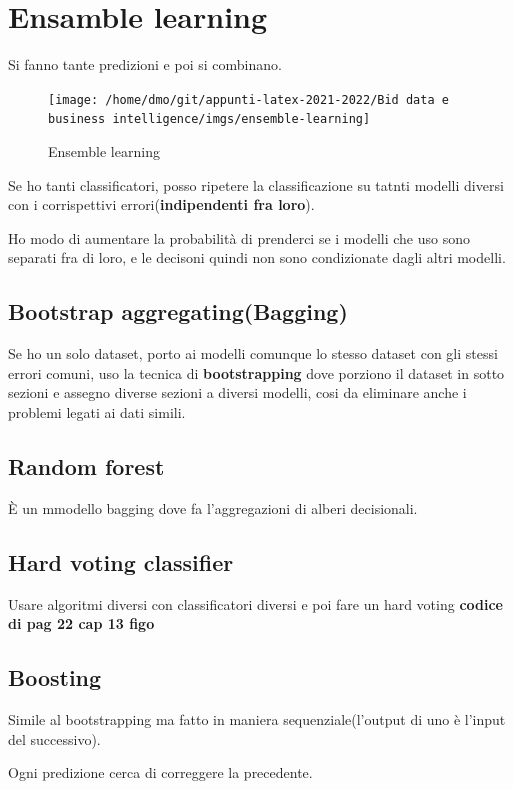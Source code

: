 \section{Ensamble learning}
Si fanno tante predizioni e poi si combinano.

\begin{figure}[H]
    \centering
    \texttt{[image: /home/dmo/git/appunti-latex-2021-2022/Bid data e business intelligence/imgs/ensemble-learning]}
    \caption{Ensemble learning}
    \label{fig:Ensemble_learning}
\end{figure}

Se ho tanti classificatori, posso ripetere la classificazione su tatnti modelli diversi
con i corrispettivi errori(\textbf{indipendenti fra loro}).

Ho modo di aumentare la probabilità di prenderci se i modelli che uso
sono separati fra di loro, e le decisoni quindi non sono condizionate
dagli altri modelli.

\subsection{Bootstrap aggregating(Bagging)}
Se ho un solo dataset, porto ai modelli comunque lo stesso dataset con gli stessi
errori comuni, uso la tecnica di \textbf{bootstrapping} dove porziono il dataset
in sotto sezioni e assegno diverse sezioni a diversi modelli,
cosi da eliminare anche i problemi legati ai dati simili.

\subsection{Random forest}
È un mmodello bagging dove fa l'aggregazioni di alberi decisionali.

\subsection{Hard voting classifier}
Usare algoritmi diversi con classificatori diversi e poi fare un hard voting
\textbf{codice di pag 22 cap 13 figo}

\subsection{Boosting}
Simile al bootstrapping ma fatto in maniera sequenziale(l'output di uno è l'input del successivo).

Ogni predizione cerca di correggere la precedente.

